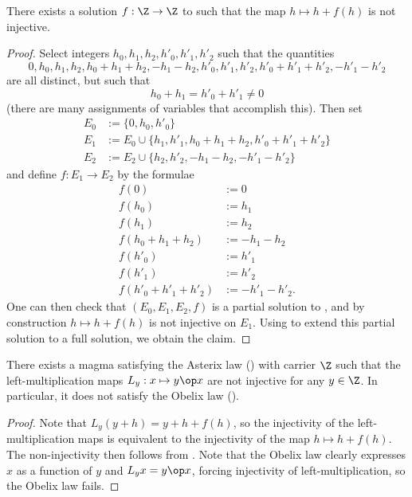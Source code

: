 \begin{corollary}\label{no-inject}  There exists a solution $f:\Z \to \Z$ to  such that the map $h \mapsto h + f(h)$ is not injective.
\end{corollary}

\begin{proof}  Select integers $h_0,h_1,h_2,h'_0,h'_1,h'_2$ such that the quantities
  $$ 0, h_0, h_1, h_2, h_0+h_1+h_2, -h_1-h_2, h'_0, h'_1, h'_2, h'_0+h'_1+h'_2, -h'_1-h'_2$$
  are all distinct, but such that
  $$ h_0 + h_1 = h'_0 + h'_1 \neq 0$$
  (there are many assignments of variables that accomplish this).  Then set
\begin{align*}
  E_0 &:= \{0,h_0, h'_0\}\\
  E_1 &:= E_0 \cup \{ h_1, h'_1, h_0+h_1+h_2, h'_0+h'_1+h'_2\}\\
  E_2 &:= E_2 \cup \{ h_2, h'_2, -h_1-h_2, -h'_1-h'_2\}
\end{align*}
and define $f: E_1 \to E_2$ by the formulae
\begin{align*}
  f(0) &:= 0 \\
  f(h_0) &:= h_1 \\
  f(h_1) &:= h_2 \\
  f(h_0+h_1+h_2) &:= -h_1-h_2 \\
  f(h'_0) &:= h'_1 \\
  f(h'_1) &:= h'_2 \\
  f(h'_0+h'_1+h'_2) &:= -h'_1-h'_2.
\end{align*}
One can then check that $(E_0, E_1, E_2, f)$ is a partial solution to , and by construction $h \mapsto h + f(h)$ is not injective on $E_1$.  Using  to extend this partial solution to a full solution, we obtain the claim.
\end{proof}

\begin{corollary}\label{asterix-obelix}  There exists a magma satisfying the Asterix law () with carrier $\Z$ such that the left-multiplication maps $L_y: x \mapsto y \op x$ are not injective for any $y \in \Z$.  In particular, it does not satisfy the Obelix law ().
\end{corollary}

\begin{proof} Note that $L_y (y+h) = y + h + f(h)$, so the injectivity of the left-multiplication maps is equivalent to the injectivity of the map $h \mapsto h + f(h)$.  The non-injectivity then follows from . Note that the Obelix law clearly expresses $x$ as a function of $y$ and $L_y x = y \op x$, forcing injectivity of left-multiplication, so the Obelix law fails.
\end{proof}

